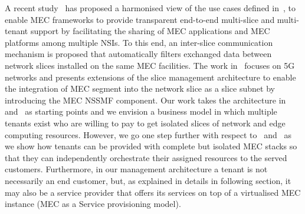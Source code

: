 A recent study~\cite{Cominardi2020} has proposed a harmonised view of the use cases defined in~\cite{MEC024}, to enable MEC frameworks to provide transparent end-to-end multi-slice and multi-tenant support by facilitating the sharing of MEC applications and MEC platforms among multiple NSIs. To this end, an inter-slice communication mechanism is proposed that automatically filters exchanged data between network slices installed on the same MEC facilities. The work in~ \cite{2020_MNET_MEC_subslice} focuses on 5G networks and presents extensions of the slice management architecture to enable the integration of MEC segment into the network slice as a slice subnet by introducing the MEC NSSMF component. Our work takes the architecture in~\cite{Cominardi2020} and~\cite{2020_MNET_MEC_subslice} as starting points and we envision a business model in which multiple tenants exist who are willing to pay to get isolated slices of network and edge computing resources.  However, we go one step further with respect to~\cite{Cominardi2020} and~\cite{2020_MNET_MEC_subslice} as we show how tenants can be provided with complete but isolated MEC stacks so that they can independently orchestrate their assigned resources to the served customers. Furthermore, in our management architecture a tenant is not necessarily an end customer, but, as explained in details in following section, it may also be a service provider that offers its services on top of a virtualised MEC instance (MEC as a Service provisioning model). 
